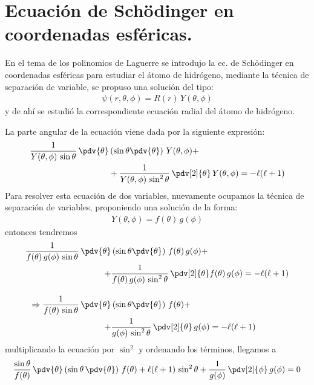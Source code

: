 \section{Ecuación de Schödinger en coordenadas esféricas.}
En el tema de los polinomios de Laguerre se introdujo la ec. de Schödinger en coordenadas esféricas para estudiar el átomo de hidrógeno, mediante la técnica de separación de variable, se propuso una solución del tipo:
\begin{align*}
\psi (r, \theta, \phi) = R(r) \, Y(\theta, \phi)
\end{align*}
y de ahí se estudió la correspondiente ecuación radial del átomo de hidrógeno.
\par
La parte angular de la ecuación viene dada por la siguiente expresión:
\begin{align}
    \begin{aligned}
\dfrac{1}{Y(\theta, \phi) \, \sin \theta} \, \pdv{\theta} &\left( \sin \theta \pdv{\theta} \right) \, Y(\theta, \phi) + \\
&+ \dfrac{1}{Y(\theta, \phi) \, \sin^{2} \theta} \, \pdv[2]{\theta} \, Y(\theta, \phi) = - \ell (\ell + 1)
\end{aligned}
\label{eq:ecuacion_10_07}
\end{align}
Para resolver esta ecuación de dos variables, nuevamente ocupamos la técnica de separación de variables, proponiendo una solución de la forma:
\begin{align*}
Y(\theta, \phi) = f(\theta) \, g(\phi)
\end{align*}
entonces tendremos
\begin{align*}
\dfrac{1}{f(\theta) \, g(\phi) \, \sin \theta} \, \pdv{\theta} &\left( \sin \theta \pdv{\theta} \right) \, f(\theta) \, g(\phi) + \\
+& \dfrac{1}{f(\theta) \, g(\phi) \, \sin^{2} \theta} \, \pdv[2]{\theta} f(\theta) \, g(\phi) = - \ell (\ell + 1) \\[1em]
\Rightarrow \dfrac{1}{f(\theta) \, \sin \theta} \, \pdv{\theta} &\left( \sin \theta \pdv{\theta} \right) \, f(\theta) + \\
+& \dfrac{1}{ g(\phi) \, \sin^{2} \theta} \, \pdv[2]{\theta} \, g(\phi) = - \ell (\ell + 1)
\end{align*}
multiplicando la ecuación por $\sin^{2}$ y ordenando los términos, llegamos a
\begin{align*}
\dfrac{\sin \theta}{f(\theta)} \, \pdv{\theta} \left( \sin \theta \, \pdv{\theta} \right) \, f(\theta) + \ell (\ell + 1) \, \sin^{2} \theta + \dfrac{1}{g(\phi)} \, \pdv[2]{\phi} \, g(\phi) = 0
\end{align*}
